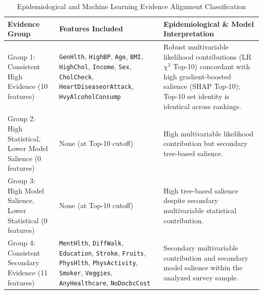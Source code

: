 \begin{table}[htbp]
\centering
\caption{Epidemiological and Machine Learning Evidence Alignment Classification}
\label{tab:evidence_alignment}
\footnotesize
\setlength{\tabcolsep}{2.5pt}
\begin{tabular}{@{}p{3.0cm}p{4.3cm}p{4.5cm}@{}}
\toprule
\textbf{Evidence Group} & \textbf{Features Included} & \textbf{Epidemiological \& Model Interpretation} \\
\midrule
Group 1: Consistent High Evidence (10 features) & \texttt{GenHlth}, \texttt{HighBP}, \texttt{Age}, \texttt{BMI}, \texttt{HighChol}, \texttt{Income}, \texttt{Sex}, \texttt{CholCheck}, \texttt{HeartDiseaseorAttack}, \texttt{HvyAlcoholConsump} & Robust multivariable likelihood contributions (LR $\chi^2$ Top-10) concordant with high gradient-boosted salience (SHAP Top-10); Top-10 set identity is identical across rankings. \\
Group 2: High Statistical, Lower Model Salience (0 features) & None (at Top-10 cutoff) & High multivariable likelihood contribution but secondary tree-based salience. \\
Group 3: High Model Salience, Lower Statistical (0 features) & None (at Top-10 cutoff) & High tree-based salience despite secondary multivariable statistical contribution. \\
Group 4: Consistent Secondary Evidence (11 features) & \texttt{MentHlth}, \texttt{DiffWalk}, \texttt{Education}, \texttt{Stroke}, \texttt{Fruits}, \texttt{PhysHlth}, \texttt{PhysActivity}, \texttt{Smoker}, \texttt{Veggies}, \texttt{AnyHealthcare}, \texttt{NoDocbcCost} & Secondary multivariable contribution and secondary model salience within the analyzed survey sample. \\
\bottomrule
\end{tabular}
\end{table}
